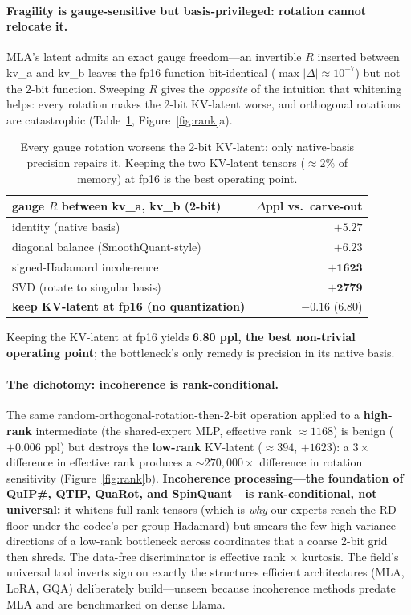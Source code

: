 \documentclass[10pt]{article}
\begin{document}
\paragraph{Fragility is gauge-sensitive but basis-privileged: rotation cannot relocate it.}
MLA's latent admits an exact gauge freedom---an invertible $R$ inserted between kv\_a and kv\_b leaves the
fp16 function bit-identical ($\max|\Delta|{\approx}10^{-7}$) but not the 2-bit function. Sweeping $R$ gives
the \emph{opposite} of the intuition that whitening helps: every rotation makes the 2-bit KV-latent worse,
and orthogonal rotations are catastrophic (Table~\ref{tab:gauge}, Figure~\ref{fig:rank}a).
\begin{table}[h]\centering\small
\begin{tabular}{lr}
\toprule
gauge $R$ between kv\_a, kv\_b (2-bit) & $\Delta$ppl vs.\ carve-out \\
\midrule
identity (native basis) & $+5.27$ \\
diagonal balance (SmoothQuant-style) & $+6.23$ \\
signed-Hadamard incoherence & $\mathbf{+1623}$ \\
SVD (rotate to singular basis) & $\mathbf{+2779}$ \\
\textbf{keep KV-latent at fp16 (no quantization)} & $\mathbf{-0.16}$ (6.80) \\
\bottomrule
\end{tabular}
\caption{Every gauge rotation worsens the 2-bit KV-latent; only native-basis precision repairs it. Keeping
the two KV-latent tensors (${\approx}2\%$ of memory) at fp16 is the best operating point.}\label{tab:gauge}
\end{table}
Keeping the KV-latent at fp16 yields \textbf{6.80 ppl, the best non-trivial operating point}; the
bottleneck's only remedy is precision in its native basis.

\paragraph{The dichotomy: incoherence is rank-conditional.}
The same random-orthogonal-rotation-then-2-bit operation applied to a \textbf{high-rank} intermediate (the
shared-expert MLP, effective rank ${\approx}1168$) is benign ($+0.006$ ppl) but destroys the
\textbf{low-rank} KV-latent (${\approx}394$, $+1623$): a $3\times$ difference in effective rank produces a
${\sim}270{,}000\times$ difference in rotation sensitivity (Figure~\ref{fig:rank}b). \textbf{Incoherence
processing---the foundation of QuIP\#, QTIP, QuaRot, and SpinQuant---is rank-conditional, not universal:}
it whitens full-rank tensors (which is \emph{why} our experts reach the RD floor under the codec's
per-group Hadamard) but smears the few high-variance directions of a low-rank bottleneck across coordinates
that a coarse 2-bit grid then shreds. The data-free discriminator is effective rank $\times$ kurtosis. The
field's universal tool inverts sign on exactly the structures efficient architectures (MLA, LoRA, GQA)
deliberately build---unseen because incoherence methods predate MLA and are benchmarked on dense Llama.
\end{document}
